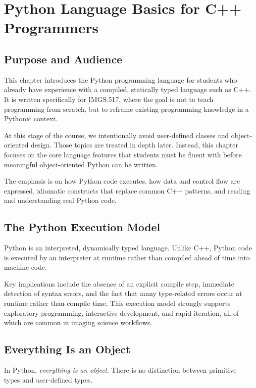 \chapter{Python Language Basics for C++ Programmers}

\section{Purpose and Audience}

This chapter introduces the Python programming language for students who already have experience with a compiled, statically typed language such as C++. It is written specifically for IMGS.517, where the goal is not to teach programming from scratch, but to reframe existing programming knowledge in a Pythonic context.

At this stage of the course, we intentionally avoid user-defined classes and object-oriented design. Those topics are treated in depth later. Instead, this chapter focuses on the core language features that students must be fluent with before meaningful object-oriented Python can be written.

The emphasis is on how Python code executes, how data and control flow are expressed, idiomatic constructs that replace common C++ patterns, and reading and understanding real Python code.

\section{The Python Execution Model}

Python is an interpreted, dynamically typed language. Unlike C++, Python code is executed by an interpreter at runtime rather than compiled ahead of time into machine code.

Key implications include the absence of an explicit compile step, immediate detection of syntax errors, and the fact that many type-related errors occur at runtime rather than compile time. This execution model strongly supports exploratory programming, interactive development, and rapid iteration, all of which are common in imaging science workflows.

\section{Everything Is an Object}

In Python, \emph{everything is an object}. There is no distinction between primitive types and user-defined types.

